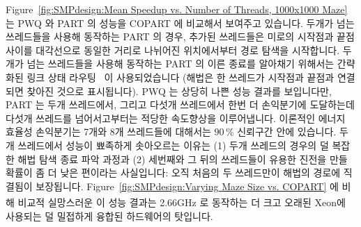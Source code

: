 Figure~\ref{fig:SMPdesign:Mean Speedup vs. Number of Threads, 1000x1000 Maze}
는 PWQ 와 PART 의 성능을 COPART 에 비교해서 보여주고 있습니다.
두개가 넘는 쓰레드들을 사용해 동작하는 PART 의 경우, 추가된 쓰레드들은 미로의
시작점과 끝점 사이를 대각선으로 동일한 거리로 나뉘어진 위치에서부터 경로 탐색을
시작합니다.
두개가 넘는 쓰레드들을 사용해 동작하는 PART 의 이른 종료를 알아채기 위해서는
간략화된 링크 상태 라우팅~\cite{BERT-87} 이 사용되었습니다 (해법은 한 쓰레드가
시작점과 끝점과 연결되면 찾아진 것으로 표시됩니다).
PWQ 는 상당히 나쁜 성능 결과를 보입니다만, PART 는 두개 쓰레드에서, 그리고
다섯개 쓰레드에서 한번 더 손익분기에 도달하는데 다섯개 쓰레드를 넘어서고부터는
적당한 속도향상을 이루어냅니다.
이론적인 에너지 효율성 손익분기는 7개와 8개 쓰레드들에 대해서는 90\,\% 신뢰구간
안에 있습니다.
두개 쓰레드에서 성능이 뾰족하게 솟아오르는 이유는 (1) 두개 쓰레드의 경우의 덜
복잡한 해법 탐색 종료 파악 과정과 (2) 세번째와 그 뒤의 쓰레드들이 유용한 진전을
만들 확률이 좀 더 낮은 편이라는 사실입니다: 오직 처음의 두 쓰레드만이 해법의
경로에 직결됨이 보장됩니다.
Figure~\ref{fig:SMPdesign:Varying Maze Size vs. COPART} 에 비해 비교적
실망스러운 이 성능 결과는 2.66GHz 로 동작하는 더 크고 오래된
Xeon\textsuperscript\textregistered 에 사용되는 덜 밀접하게 융합된 하드웨어의
탓입니다.

